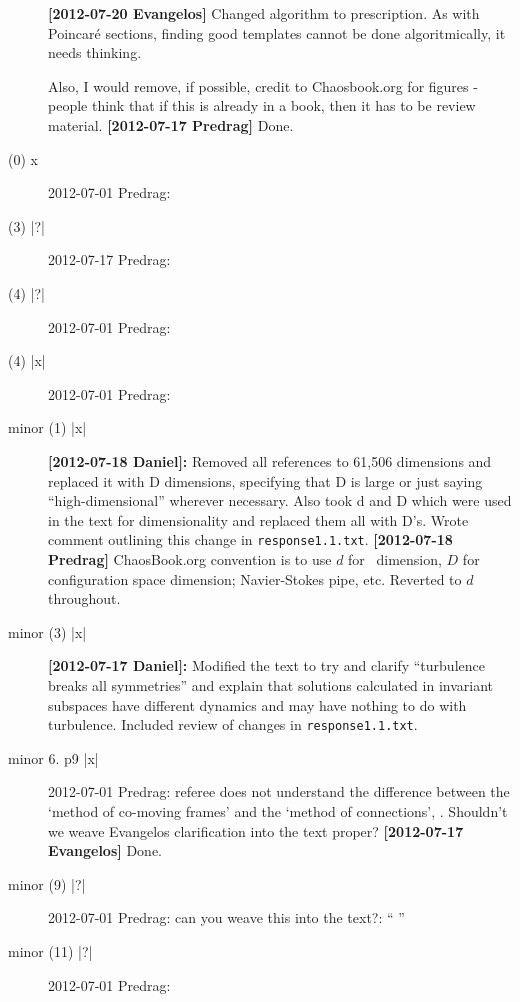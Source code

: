 \begin{description}
{\bf [2012-07-20 Evangelos]} Changed algorithm to prescription. As with
Poincar\'e sections, finding good templates cannot be done algoritmically,
it needs thinking.

Also, I would remove, if possible, credit to Chaosbook.org for figures -
people think that if this is already in a book, then it has to be review
material.
 {\bf [2012-07-17 Predrag]} Done.


\item[(0)  x ] 2012-07-01 Predrag:

\item[(3) |?|] 2012-07-17 Predrag:

\item[(4) |?|] 2012-07-01 Predrag:

\item[(4) |x|] 2012-07-01 Predrag:

\item[minor (1) |x|] {\bf [2012-07-18 Daniel]:} Removed all references to
61,506 dimensions and replaced it with D dimensions, specifying that D is
large or just saying ``high-dimensional'' wherever necessary. Also took
d and D which were used in the text for dimensionality and replaced them
all with D's. Wrote comment outlining this change in \texttt{response1.1.txt}.
{\bf [2012-07-18 Predrag]}
ChaosBook.org convention is to use $d$ for \statesp\ dimension, $D$ for
configuration space dimension; Navier-Stokes pipe, etc. Reverted to $d$
throughout.

\item[minor (3) |x|] {\bf [2012-07-17 Daniel]:} Modified the text to try
and clarify ``turbulence breaks all symmetries'' and explain that
solutions calculated in invariant subspaces have different dynamics and
may have nothing to do with turbulence. Included review of changes in
\texttt{response1.1.txt}.

\item[minor 6. p9 |x|] 2012-07-01 Predrag:
 referee does not understand the difference between the `method of
 co-moving frames' and the `method of connections',
 . Shouldn't we weave Evangelos clarification
 into the text proper? {\bf [2012-07-17 Evangelos]} Done.

\item[minor (9) |?|] 2012-07-01 Predrag: can you weave this into the text?: ``
''

\item[minor (11) |?|] 2012-07-01 Predrag:



\end{description}
